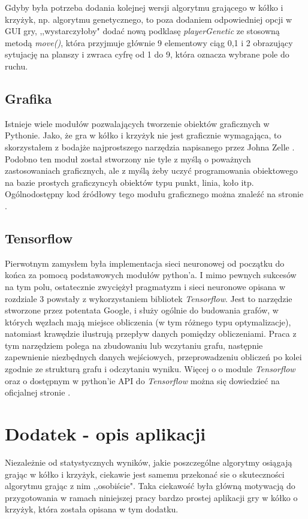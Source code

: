 \documentclass[licencjacka]{pracamgr}
\begin{document}
Gdyby była potrzeba dodania kolejnej wersji algorytmu grającego w kółko i krzyżyk, np. algorytmu genetycznego, to poza dodaniem odpowiedniej opcji w GUI gry, ,,wystarczyłoby" dodać nową podklasę \textit{playerGenetic} ze stosowną metodą \textit{move()}, która przyjmuje głównie 9 elementowy ciąg 0,1 i 2 obrazujący sytujację na planszy i zwraca cyfrę od 1 do 9, która oznacza wybrane pole do ruchu.  

\section{Grafika}
Istnieje wiele modułów pozwalających tworzenie obiektów graficznych w Pythonie. Jako, że gra w kółko i krzyżyk nie jest graficznie wymagająca, to skorzystałem z bodajże najprostszego narzędzia napisanego przez Johna Zelle \cite{Graphics}. Podobno ten moduł został stworzony nie tyle z myślą o poważnych zastosowaniach graficznych, ale z myślą żeby uczyć programowania obiektowego na bazie prostych graficzyncyh obiektów typu punkt, linia, koło itp.  Ogólnodostępny kod źródłowy tego modułu graficznego można znaleźć na stronie \cite{Graphics}.

\section{Tensorflow}
Pierwotnym zamysłem była implementacja  sieci neuronowej od początku do końca za pomocą podstawowych modułów python'a. I mimo pewnych sukcesów na tym polu, ostatecznie zwyciężył pragmatyzm i sieci neuronowe opisana w rozdziale 3 powstały z wykorzystaniem bibliotek \textit{Tensorflow}. Jest to narzędzie stworzone przez potentata Google, i służy ogólnie do budowania grafów, w których węzłach mają miejsce obliczenia (w tym różnego typu optymalizacje), natomiast krawędzie ilustrują przepływ danych pomiędzy obliczeniami. Praca z tym narzędziem polega na zbudowaniu lub wczytaniu grafu, następnie zapewnienie niezbędnych danych wejściowych, przeprowadzeniu obliczeń po kolei zgodnie ze strukturą grafu i odczytaniu wyniku.  Więcej o o module \textit{Tensorflow} oraz o dostępnym w python'ie API do  \textit{Tensorflow} można się dowiedzieć na oficjalnej stronie \cite{TF}.


\chapter{Dodatek - opis aplikacji}

Niezależnie od statystycznych wyników, jakie poszczególne algorytmy osiągają grając w kółko i krzyżyk, ciekawie jest samemu przekonać sie o 
skuteczności algorytmu grając z nim ,,osobiście". Taka ciekawość była główną motywacją do przygotowania w ramach niniejszej pracy 
bardzo prostej aplikacji gry w kółko o krzyżyk, która została opisana w tym dodatku. \\
\end{document}
